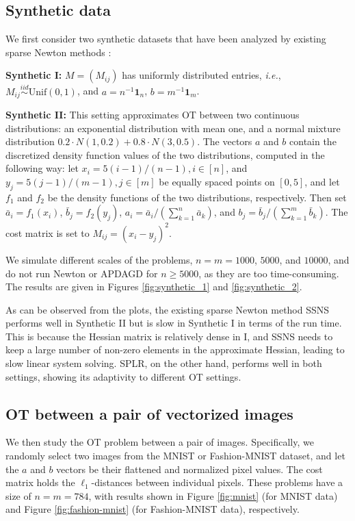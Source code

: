 \documentclass{article}
\theoremstyle{plain}
\theoremstyle{definition}
\theoremstyle{remark}
\begin{document}

\subsection{Synthetic data}
\label{subsec:synthetic_data}
We first consider two synthetic datasets that have been analyzed by existing sparse Newton methods \citep{tang2024accelerating,tang2024safe}:

\textbf{Synthetic I:} $M=(M_{ij})$ has uniformly distributed entries, \emph{i.e.}, $M_{ij}\overset{iid}{\sim}\mathrm{Unif}(0,1)$, and $a=n^{-1}\mathbf{1}_n$, $b=m^{-1}\mathbf{1}_m$.

\textbf{Synthetic II:} This setting approximates OT between two continuous distributions: an exponential distribution with mean one, and a normal mixture distribution $0.2\cdot N(1,0.2)+0.8\cdot N(3,0.5)$. The vectors $a$ and $b$ contain the discretized density function values of the two distributions, computed in the following way: let $x_{i}=5(i-1)/(n-1), i\in [n]$, and $y_{j}=5(j-1)/(m-1), j\in [m]$ be equally spaced points on $[0, 5]$, and let $f_{1}$ and $f_{2}$ be the density functions of the two distributions, respectively. Then set $\bar{a}_{i}=f_{1}(x_{i})$, $\bar{b}_{j}=f_{2}(y_{j})$, $a_{i}=\bar{a}_{i}/\left(\sum_{k=1}^{n}\bar{a}_{k}\right)$, and $b_{j}=\bar{b}_{j}/\left(\sum_{k=1}^{m}\bar{b}_{k}\right)$. The cost matrix is set to $M_{ij}=(x_{i}-y_{j})^{2}$.

We simulate different scales of the problems, $n=m=1000$, $5000$, and $10000$, and do not run Newton or APDAGD for $n\ge 5000$, as they are too time-consuming. The results are given in Figures \ref{fig:synthetic_1} and \ref{fig:synthetic_2}.

As can be observed from the plots, the existing sparse Newton method SSNS performs well in Synthetic II but is slow in Synthetic I in terms of the run time. This is because the Hessian matrix is relatively dense in I, and SSNS needs to keep a large number of non-zero elements in the approximate Hessian, leading to slow linear system solving. SPLR, on the other hand, performs well in both settings, showing its adaptivity to different OT settings.

\subsection{OT between a pair of vectorized images}
We then study the OT problem between a pair of images. Specifically, we randomly select two images from the MNIST \citep{lecun1998gradientbased} or Fashion-MNIST \citep{xiao2017fashionmnist} dataset, and let the $a$ and $b$ vectors be their flattened and normalized pixel values. The cost matrix holds the $\ell_{1}$-distances between individual pixels. These problems have a size of $n=m=784$, with results shown in Figure \ref{fig:mnist} (for MNIST data) and Figure \ref{fig:fashion-mnist} (for Fashion-MNIST data), respectively.
\end{document}

